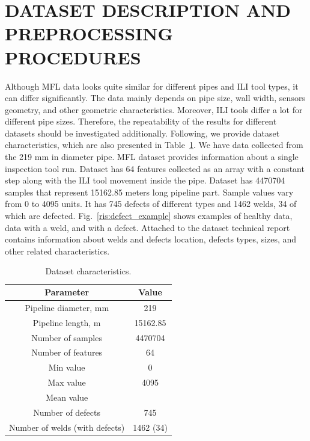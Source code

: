 \section{DATASET DESCRIPTION AND PREPROCESSING PROCEDURES}
\label{DATASET DESCRIPTION AND PREPROCESSING PROCEDURES}
Although MFL data looks quite similar for different pipes and ILI tool types, it can differ significantly.
The data mainly depends on pipe size, wall width, sensors geometry, and other geometric characteristics.
Moreover, ILI tools differ a lot for different pipe sizes.
Therefore, the repeatability of the results for different datasets should be investigated additionally.
Following, we provide dataset characteristics, which are also presented in Table~\ref{tab:dataset}.
We have data collected from the 219 mm in diameter pipe.
MFL dataset provides information about a single inspection tool run.
Dataset has 64 features collected as an array with a constant step along with the ILI tool movement inside the pipe.
Dataset has 4470704 samples that represent 15162.85 meters long pipeline part.
Sample values vary from 0 to 4095 units.
It has 745 defects of different types and 1462 welds, 34 of which are defected.
Fig.~\ref{ris:defect_example} shows examples of healthy data, data with a weld, and with a defect.
Attached to the dataset technical report contains information about welds and defects location, defects types, sizes, and other related characteristics.
\begin{table}[!htb]
	\caption{Dataset characteristics.}
	\begin{center}
		\small
		\begin{tabular}{|  c | c   |}
			\hline
			Parameter & Value \\
			\hline
			Pipeline diameter, mm &  219 \\
			Pipeline length, m &  15162.85 \\
			Number of samples &  4470704 \\
			Number of features & 64 \\
			Min value & 0 \\
			Max value & 4095 \\
			Mean value &   \\
			Number of defects & 745 \\
			Number of welds (with defects) & 1462 (34) \\
			\hline
		\end{tabular}
		\label{tab:dataset}
	\end{center}
\end{table}

